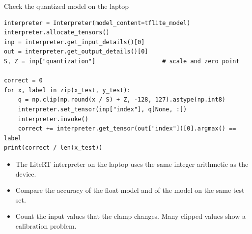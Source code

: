 \begin{frame}[fragile]{Check the quantized model on the laptop}
\begin{lstlisting}[style=python]
interpreter = Interpreter(model_content=tflite_model)
interpreter.allocate_tensors()
inp = interpreter.get_input_details()[0]
out = interpreter.get_output_details()[0]
S, Z = inp["quantization"]                   # scale and zero point

correct = 0
for x, label in zip(x_test, y_test):
    q = np.clip(np.round(x / S) + Z, -128, 127).astype(np.int8)
    interpreter.set_tensor(inp["index"], q[None, :])
    interpreter.invoke()
    correct += interpreter.get_tensor(out["index"])[0].argmax() == label
print(correct / len(x_test))
\end{lstlisting}
  \small
  \begin{itemize}
    \item The LiteRT interpreter on the laptop uses the same integer
          arithmetic as the device.
    \item Compare the accuracy of the float model and of the 
          model on the same test set.
    \item Count the input values that the clamp changes. Many clipped
          values show a calibration problem.
  \end{itemize}
\end{frame}

